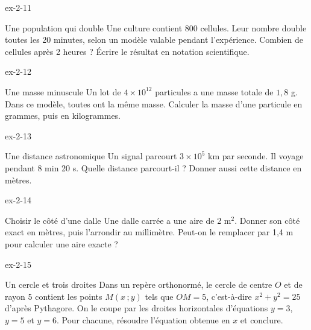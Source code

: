 \clearpage{}
\begin{blocLivre}{ex-2-11}\begin{exercice}[3]{Une population qui double}
Une culture contient 800 cellules. Leur nombre double toutes les 20 minutes, selon un modèle valable pendant l’expérience. Combien de cellules après 2 heures ? Écrire le résultat en notation scientifique.
\end{exercice}\end{blocLivre}
\begin{blocLivre}{ex-2-12}\begin{exercice}[3]{Une masse minuscule}
Un lot de $4\times10^{12}$ particules a une masse totale de $1{,}8$ g. Dans ce modèle, toutes ont la même masse. Calculer la masse d’une particule en grammes, puis en kilogrammes.
\end{exercice}\end{blocLivre}
\begin{blocLivre}{ex-2-13}\begin{exercice}[3]{Une distance astronomique}
Un signal parcourt $3\times10^5$ km par seconde. Il voyage pendant 8 min 20 s. Quelle distance parcourt-il ? Donner aussi cette distance en mètres.
\end{exercice}\end{blocLivre}
\begin{blocLivre}{ex-2-14}\begin{exercice}[3]{Choisir le côté d’une dalle}
Une dalle carrée a une aire de 2 m$^2$. Donner son côté exact en mètres, puis l’arrondir au millimètre. Peut-on le remplacer par 1,4 m pour calculer une aire exacte ?
\end{exercice}\end{blocLivre}
\begin{blocLivre}{ex-2-15}\begin{exercice}[3]{Un cercle et trois droites}
Dans un repère orthonormé, le cercle de centre $O$ et de rayon 5 contient les points $M(x\,;y)$ tels que $OM=5$, c’est-à-dire $x^2+y^2=25$ d’après Pythagore. On le coupe par les droites horizontales d’équations $y=3$, $y=5$ et $y=6$. Pour chacune, résoudre l’équation obtenue en $x$ et conclure.
\label{fig-ex-2-15}
\end{exercice}\end{blocLivre}

\clearpage
